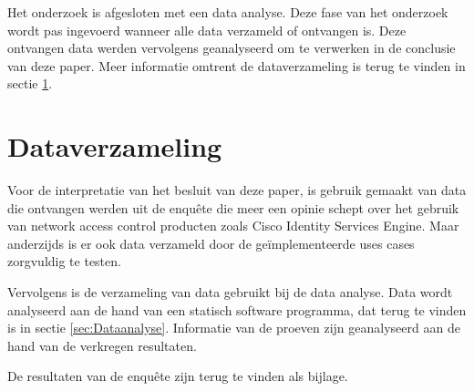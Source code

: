 \newline
\newline
Het onderzoek is afgesloten met een data analyse. Deze fase van het onderzoek wordt pas ingevoerd wanneer alle data verzameld of ontvangen is. Deze ontvangen data werden vervolgens geanalyseerd om te verwerken in de conclusie van deze paper. Meer informatie omtrent de dataverzameling is terug te vinden in sectie \ref{sec:Dataverzameling}. 

\section{Dataverzameling}
\label{sec:Dataverzameling}
Voor de interpretatie van het besluit van deze paper, is gebruik gemaakt van data die ontvangen werden uit de enquête die meer een opinie schept over het gebruik van network access control producten zoals Cisco Identity Services Engine. Maar anderzijds is er ook data verzameld door de geïmplementeerde uses cases zorgvuldig te testen.

Vervolgens is de verzameling van data gebruikt bij de data analyse. Data wordt analyseerd aan de hand van een statisch software programma, dat terug te vinden is in sectie \ref{sec:Dataanalyse}. Informatie van de proeven zijn geanalyseerd aan de hand van de verkregen resultaten. 

De resultaten van de enquête zijn terug te vinden als bijlage.

